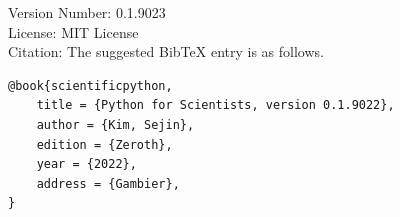 \documentclass{book}
\newcommand{\booklicense}{MIT License}
\newcommand{\bookversion}{0.1.9023}
\begin{document}
\begin{titlepage}
\begin{flushleft}
Version Number: \bookversion\\
License: \booklicense\\
Citation: The suggested BibTeX entry is as follows.
\begin{lstlisting}[style=none]
@book{scientificpython,
    title = {Python for Scientists, version 0.1.9022},
    author = {Kim, Sejin},
    edition = {Zeroth},
    year = {2022},
    address = {Gambier},
}
\end{lstlisting}

\end{flushleft}
\end{titlepage}
\restoregeometry
\end{document}
